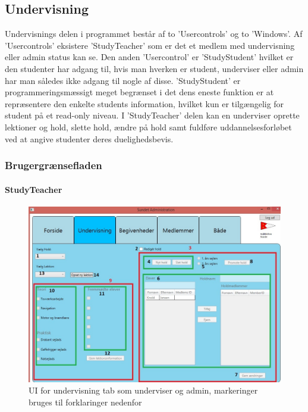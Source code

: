 \subsection{Undervisning}
Undervisnings delen i programmet består af to 'Usercontrols' og to 'Windows'.
Af 'Usercontrols' eksistere 'StudyTeacher' som er det et medlem med undervisning eller admin status kan se.
Den anden 'Usercontrol' er 'StudyStudent' hvilket er den studenter har adgang til, hvis man hverken er student, underviser eller admin har man således ikke adgang til nogle af disse. 
'StudyStudent' er programmeringsmæssigt meget begrænset i det dens eneste funktion er at repræsentere den enkelte students information, hvilket kun er tilgængelig for student på et read-only niveau.
I 'StudyTeacher' delen kan en underviser oprette lektioner og hold, slette hold, ændre på hold samt fuldføre uddannelsesforløbet ved at angive studenter deres duelighedsbevis.

\subsubsection{Brugergrænsefladen}
\paragraph*{StudyTeacher}
\begin{figure}[htbp]
  \centering
  \includegraphics[width=1\textwidth]{images/UI/StudyTeacherMarked.jpg}
  \caption[UIStudyTeacher]{UI for undervisning tab som underviser og admin, markeringer bruges til forklaringer nedenfor}
  \label{fig:StudyTeacher}
\end{figure}

